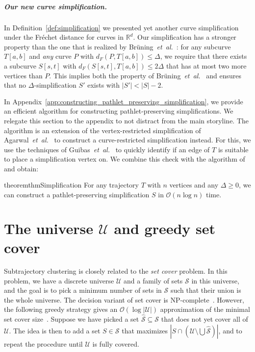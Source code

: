 \documentclass[a4paper,UKenglish,cleveref,thm-restate,notab]{lipics-v2021}
\makeatletter
\newcommand{\etal}{\textit{et~al.\@}\xspace}
\newcommand{\f}{Fr\'echet\xspace}
\newcommand{\dF}{\ensuremath{d_F}}
\newcommand{\bigO}{\mathcal{O}}
\newcommand{\R}{\mathbb{R}}
\newcommand{\U}{\mathcal{U}}
\makeatother
\begin{document}
\subparagraph*{Our new curve simplification.}
    In Definition~\ref{def:simplification} we presented yet another curve simplification under the \f distance for curves in $\R^d$.  
    Our simplification has a stronger property than the one that is realized by Br\"{u}ning~\etal~\cite{bruning_faster_2022}: 
    for any subcurve $T[a,b]$ and \emph{any} curve $P$ with $\dF(P, T[a, b]) \leq \Delta$, we require that there exists a subcurve $S[s, t]$ with $\dF(S[s, t], T[a, b]) \leq 2\Delta$ that has at most two more vertices than $P$.
    This implies both the property of Br\"{u}ning~\etal~\cite{bruning_faster_2022} and ensures that no $\Delta$-simplification $S'$ exists with $|S'| < |S| - 2$.

    In Appendix~\ref{app:constructing_pathlet_preserving_simplification}, we provide an efficient algorithm for constructing pathlet-preserving simplifications.
    We relegate this section to the appendix to not distract from the main storyline.
    The algorithm is an extension of the vertex-restricted simplification of Agarwal~\etal~\cite{agarwal_near-linear_2005} to construct a curve-restricted simplification instead.
    For this, we use the techniques of Guibas~\etal~\cite{guibas93minimum_link} to quickly identify if an edge of $T$ is suitable to place a simplification vertex on.
    We combine this check with the algorithm of~\cite{agarwal_near-linear_2005} and obtain:

    \begin{restatable}{theorem}{thmSimplification}
    \label{thm:simplification}
        For any trajectory $T$ with $n$ vertices and any $\Delta \geq 0$, we can construct a pathlet-preserving simplification $S$ in $\bigO(n \log n)$ time. 
    \end{restatable}

\section{The universe $\U$ and greedy set cover}
\label{sec:set_cover}


 Subtrajectory clustering is closely related to the \emph{set cover} problem.
    In this problem, we have a discrete universe $\U$ and a family of sets $\mathcal{S}$ in this universe, and the goal is to pick a minimum number of sets in $\mathcal{S}$ such that their union is the whole universe.
    The decision variant of set cover is NP-complete~\cite{karp72reducibility}.
    However, the following greedy strategy gives an $\bigO(\log |\U|)$ approximation of the minimal set cover size~\cite{chvatal79greedy}.
    Suppose we have picked a set $\hat{\mathcal{S}} \subseteq \mathcal{S}$ that does not yet cover all of $\U$.
    The idea is then to add a set $S \in \mathcal{S}$ that maximizes $|S \cap (\U \setminus \bigcup \hat{\mathcal{S}})|$, and to repeat the procedure until $\U$ is fully covered.
    
\end{document}
